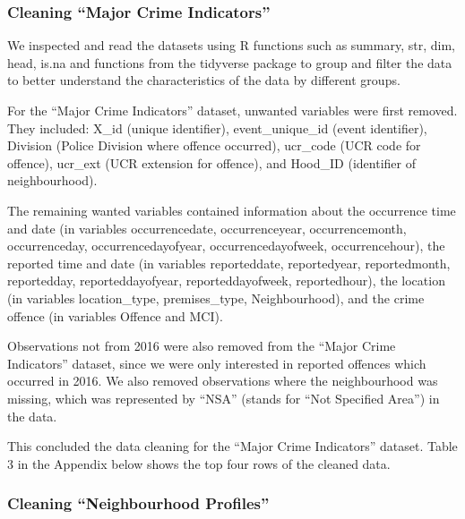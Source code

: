 \documentclass[
]{article}
\begin{document}
\hypertarget{cleaning-major-crime-indicators}{%
\subsubsection{Cleaning ``Major Crime
Indicators''}\label{cleaning-major-crime-indicators}}

We inspected and read the datasets using R functions such as summary,
str, dim, head, is.na and functions from the tidyverse package to group
and filter the data to better understand the characteristics of the data
by different groups.

For the ``Major Crime Indicators'' dataset, unwanted variables were
first removed. They included: X\_id (unique identifier),
event\_unique\_id (event identifier), Division (Police Division where
offence occurred), ucr\_code (UCR code for offence), ucr\_ext (UCR
extension for offence), and Hood\_ID (identifier of neighbourhood).

The remaining wanted variables contained information about the
occurrence time and date (in variables occurrencedate, occurrenceyear,
occurrencemonth, occurrenceday, occurrencedayofyear,
occurrencedayofweek, occurrencehour), the reported time and date (in
variables reporteddate, reportedyear, reportedmonth, reportedday,
reporteddayofyear, reporteddayofweek, reportedhour), the location (in
variables location\_type, premises\_type, Neighbourhood), and the crime
offence (in variables Offence and MCI).

Observations not from 2016 were also removed from the ``Major Crime
Indicators'' dataset, since we were only interested in reported offences
which occurred in 2016. We also removed observations where the
neighbourhood was missing, which was represented by ``NSA'' (stands for
``Not Specified Area'') in the data.

This concluded the data cleaning for the ``Major Crime Indicators''
dataset. Table 3 in the Appendix below shows the top four rows of the
cleaned data.

\hypertarget{cleaning-neighbourhood-profiles}{%
\subsubsection{Cleaning ``Neighbourhood
Profiles''}\label{cleaning-neighbourhood-profiles}}
\end{document}
